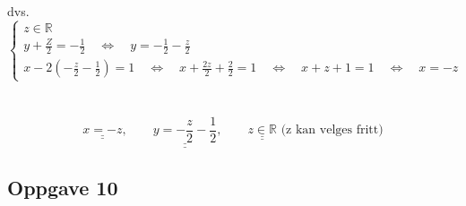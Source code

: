 \documentclass{article}
\newcommand{\uu}[1]{\underline{\underline{#1}}}
\newcommand{\eq}{\quad\Longleftrightarrow\quad}
\begin{document}
dvs.
\(\begin{cases}
    z \in \mathbb{R} \\
    y + \frac{Z}{2} = -\frac{1}{2} \eq y = -\frac{1}{2} - \frac{z}{2} \\
    x -2(-\frac{z}{2}-\frac{1}{2}) = 1 \eq x + \frac{2z}{2} + \frac{2}{2} = 1 \eq x + z + 1 = 1 \eq x = -z
\end{cases}\)
\\ \\ \\
\[\uu{x = -z}, \qquad \uu{y = -\frac{z}{2}-\frac{1}{2}}, \qquad \uu{z \in \mathbb{R}} \text{ (z kan velges fritt)}\]

\newpage

\subsection*{Oppgave 10}
\end{document}
